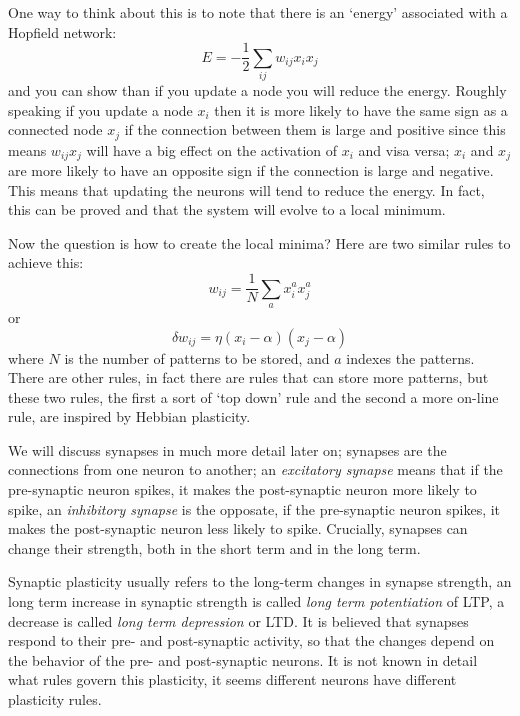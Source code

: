 \documentclass[12pt]{article}
\begin{document}
One way to think about this is to note that there is an
\lq{}energy\rq{} associated with a Hopfield network:
\begin{equation}
E=-\frac{1}{2}\sum_{ij} w_{ij}x_ix_j
\end{equation}
and you can show than if you update a node you will reduce the energy.
Roughly speaking if you update a node $x_i$ then it is more likely to
have the same sign as a connected node $x_j$ if the connection between
them is large and positive since this means $w_{ij}x_j$ will have a
big effect on the activation of $x_i$ and visa versa; $x_i$ and $x_j$
are more likely to have an opposite sign if the connection is large
and negative. This means that updating the neurons will tend to reduce
the energy. In fact, this can be proved and that the system will
evolve to a local minimum.

Now the question is how to create the local minima? Here are two
similar rules to achieve this:
\begin{equation}
w_{ij}=\frac{1}{N}\sum_a x^a_ix^a_j
\end{equation}
or 
\begin{equation}
\delta w_{ij}=\eta (x_i-\alpha)(x_j-\alpha)
\end{equation}
where $N$ is the number of patterns to be stored, and $a$ indexes the
patterns. There are other rules, in fact there are rules that can
store more patterns, but these two rules, the first a sort of \lq{}top
down\rq{} rule and the second a more on-line rule, are inspired by
Hebbian plasticity.

We will discuss synapses in much more detail later on; synapses are
the connections from one neuron to another; an \textsl{excitatory
  synapse} means that if the pre-synaptic neuron spikes, it makes the
post-synaptic neuron more likely to spike, an \textsl{inhibitory
  synapse} is the opposate, if the pre-synaptic neuron spikes, it
makes the post-synaptic neuron less likely to spike. Crucially,
synapses can change their strength, both in the short term and in the
long term.

Synaptic plasticity usually refers to the long-term changes in synapse
strength, an long term increase in synaptic strength is called
\textsl{long term potentiation} of LTP, a decrease is called
\textsl{long term depression} or LTD. It is believed that synapses
respond to their pre- and post-synaptic activity, so that the changes
depend on the behavior of the pre- and post-synaptic neurons. It is
not known in detail what rules govern this plasticity, it seems
different neurons have different plasticity rules.
\end{document}
